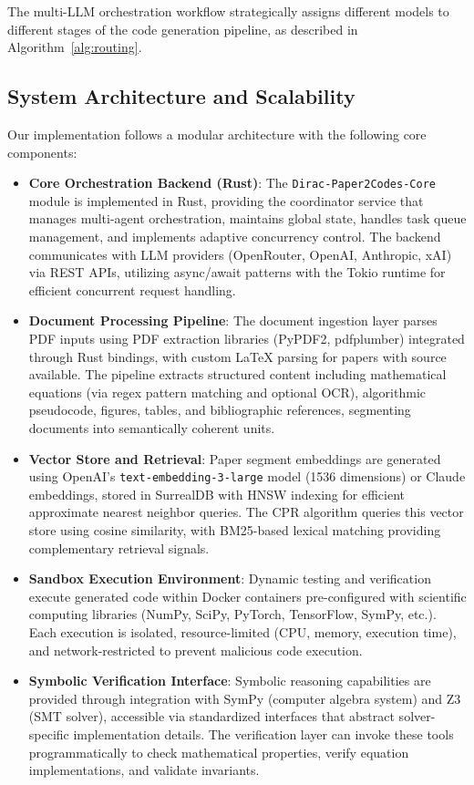 \documentclass{ieeeaccess}
\begin{document}
The multi-LLM orchestration workflow strategically assigns different models to different stages of the code generation pipeline, as described in Algorithm~\ref{alg:routing}.


\subsection{System Architecture and Scalability}
Our implementation follows a modular architecture with the following core components:

\begin{itemize}
    \item \textbf{Core Orchestration Backend (Rust)}: The \texttt{Dirac-Paper2Codes-Core} module is implemented in Rust, providing the coordinator service that manages multi-agent orchestration, maintains global state, handles task queue management, and implements adaptive concurrency control. The backend communicates with LLM providers (OpenRouter, OpenAI, Anthropic, xAI) via REST APIs, utilizing async/await patterns with the Tokio runtime for efficient concurrent request handling.
    
    \item \textbf{Document Processing Pipeline}: The document ingestion layer parses PDF inputs using PDF extraction libraries (PyPDF2, pdfplumber) integrated through Rust bindings, with custom LaTeX parsing for papers with source available. The pipeline extracts structured content including mathematical equations (via regex pattern matching and optional OCR), algorithmic pseudocode, figures, tables, and bibliographic references, segmenting documents into semantically coherent units.
    
    \item \textbf{Vector Store and Retrieval}: Paper segment embeddings are generated using OpenAI's \texttt{text-embedding-3-large} model (1536 dimensions) or Claude embeddings, stored in SurrealDB with HNSW indexing for efficient approximate nearest neighbor queries. The CPR algorithm queries this vector store using cosine similarity, with BM25-based lexical matching providing complementary retrieval signals.
    
    \item \textbf{Sandbox Execution Environment}: Dynamic testing and verification execute generated code within Docker containers pre-configured with scientific computing libraries (NumPy, SciPy, PyTorch, TensorFlow, SymPy, etc.). Each execution is isolated, resource-limited (CPU, memory, execution time), and network-restricted to prevent malicious code execution.
    
    \item \textbf{Symbolic Verification Interface}: Symbolic reasoning capabilities are provided through integration with SymPy (computer algebra system) and Z3 (SMT solver), accessible via standardized interfaces that abstract solver-specific implementation details. The verification layer can invoke these tools programmatically to check mathematical properties, verify equation implementations, and validate invariants.
\end{itemize}
\end{document}
